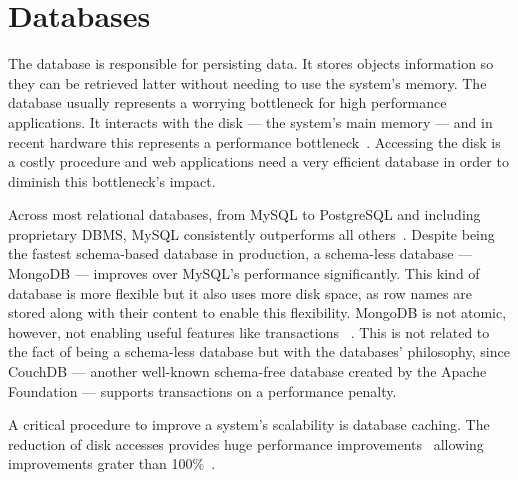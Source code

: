 \section{Databases} %
\label{state:sec:databases}
The database is responsible for persisting data. It stores objects information so they can be retrieved latter without needing to use the system's memory.
The database usually represents a worrying bottleneck for high performance applications. It interacts with the disk --- the system's main memory --- and in recent hardware this represents a performance bottleneck~\cite{memory_wall}. Accessing the disk is a costly procedure and web applications need a very efficient database in order to diminish this bottleneck's impact.

Across most relational databases, from MySQL to PostgreSQL and including proprietary DBMS, MySQL consistently outperforms all others~\cite{benchmark_relational_databases}.
Despite being the fastest schema-based database in production, a schema-less database --- MongoDB --- improves over MySQL's performance significantly. This kind of database is more flexible but it also uses more disk space, as row names are stored along with their content to enable this flexibility. MongoDB is not atomic, however, not enabling useful features like transactions ~\cite{mysql_to_mongodb}. This is not related to the fact of being a schema-less database but with the databases' philosophy, since CouchDB --- another well-known schema-free database created by the Apache Foundation --- supports transactions on a performance penalty.

A critical procedure to improve a system's scalability is database caching. The reduction of disk accesses provides huge performance improvements~\cite{scaling_rails_bottomup} allowing improvements grater than 100\%~\cite{rapid_prototyping_mdd,high_performance_database_caching}.

